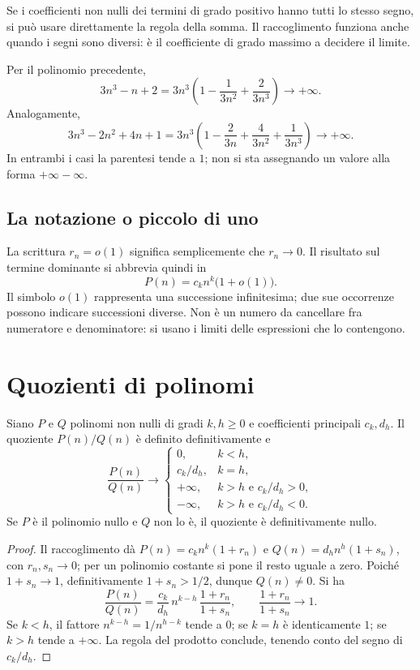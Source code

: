 Se i coefficienti non nulli dei termini di grado positivo hanno tutti lo stesso segno, si può usare direttamente la regola della somma. Il raccoglimento funziona anche quando i segni sono diversi: è il coefficiente di grado massimo a decidere il limite.

\begin{esempio}
Per il polinomio precedente,
\[
3n^3-n+2=3n^3\left(1-\frac1{3n^2}+\frac2{3n^3}\right)\longrightarrow+\infty.
\]
Analogamente,
\[
3n^3-2n^2+4n+1
=3n^3\left(1-\frac2{3n}+\frac4{3n^2}+\frac1{3n^3}\right)
\longrightarrow+\infty.
\]
In entrambi i casi la parentesi tende a $1$; non si sta assegnando un valore alla forma $+\infty-\infty$.
\end{esempio}

\subsection{La notazione o piccolo di uno}

La scrittura $r_n=o(1)$ significa semplicemente che $r_n\to0$. Il risultato sul termine dominante si abbrevia quindi in
\[
P(n)=c_kn^k\bigl(1+o(1)\bigr).
\]
Il simbolo $o(1)$ rappresenta una successione infinitesima; due sue occorrenze possono indicare successioni diverse. Non è un numero da cancellare fra numeratore e denominatore: si usano i limiti delle espressioni che lo contengono.

\section{Quozienti di polinomi}

\begin{proposizione}
Siano $P$ e $Q$ polinomi non nulli di gradi $k,h\ge0$ e coefficienti principali $c_k,d_h$. Il quoziente $P(n)/Q(n)$ è definito definitivamente e
\[
\frac{P(n)}{Q(n)}\longrightarrow
\begin{cases}
0,&k<h,\\
c_k/d_h,&k=h,\\
+\infty,&k>h\text{ e }c_k/d_h>0,\\
-\infty,&k>h\text{ e }c_k/d_h<0.
\end{cases}
\]
Se $P$ è il polinomio nullo e $Q$ non lo è, il quoziente è definitivamente nullo.
\end{proposizione}
\begin{proof}
Il raccoglimento dà $P(n)=c_kn^k(1+r_n)$ e $Q(n)=d_hn^h(1+s_n)$, con $r_n,s_n\to0$; per un polinomio costante si pone il resto uguale a zero. Poiché $1+s_n\to1$, definitivamente $1+s_n>1/2$, dunque $Q(n)\ne0$. Si ha
\[
\frac{P(n)}{Q(n)}
=\frac{c_k}{d_h}\,n^{k-h}\,\frac{1+r_n}{1+s_n},
\qquad \frac{1+r_n}{1+s_n}\longrightarrow1.
\]
Se $k<h$, il fattore $n^{k-h}=1/n^{h-k}$ tende a $0$; se $k=h$ è identicamente $1$; se $k>h$ tende a $+\infty$. La regola del prodotto conclude, tenendo conto del segno di $c_k/d_h$.
\end{proof}


